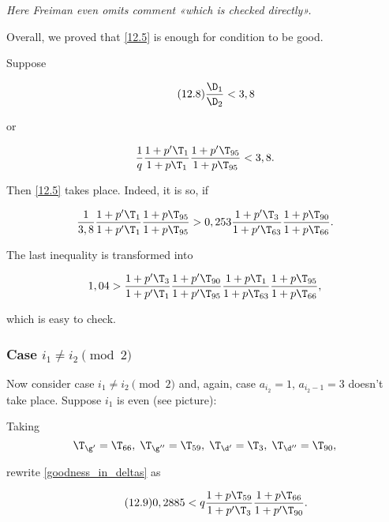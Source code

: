 {
	\itshape
	Here Freiman even omits comment «which is checked directly».
}

Overall, we proved that \ref{12.5} is enough for condition to be good.

Suppose

\begin{equation}\tag{12.8}\label{goodness_condition_3,8}
	\dfrac{\D_1}{\D_2} < 3,8
\end{equation}

or

\begin{equation*}
	\dfrac{1}{q}
	\dfrac{1 + p' \T_{1}}{1 + p \T_{1}}
	\dfrac{1 + p' \T_{95}}{1 + p \T_{95}}
	<
	3,8.
\end{equation*}

Then \ref{12.5} takes place. Indeed, it is so, if

\begin{equation*}
	\dfrac{1}{3,8}
	\dfrac{1 + p' \T_{1}}{1 + p' \T_{1}}
	\dfrac{1 + p \T_{95}}{1 + p \T_{95}}
	>
	0,253
	\dfrac{1 + p' \T_{3}}{1 + p' \T_{63}}
	\dfrac{1 + p \T_{90}}{1 + p \T_{66}}.
\end{equation*}

The last inequality is transformed into

\begin{equation*}
	1,04
	>
	\dfrac{1 + p' \T_{3}}{1 + p' \T_{1}}
	\dfrac{1 + p' \T_{90}}{1 + p' \T_{95}}
	\dfrac{1 + p \T_{1}}{1 + p \T_{63}}
	\dfrac{1 + p \T_{95}}{1 + p \T_{66}},
\end{equation*}

which is easy to check.

\subsubsection{Case $i_1 \ne i_2 \pmod 2$}

Now consider case $i_1 \ne i_2 \pmod 2$
and, again, case $a_{i_2} = 1$, $a_{i_2 - 1} = 3$
doesn't take place.
Suppose $i_1$ is even (see picture):


Taking
\begin{equation*}
	\T_{\g'} = \T_{66},\;
	\T_{\g''} = \T_{59},\;
	\T_{\d'} = \T_{3},\;
	\T_{\d''} = \T_{90},
\end{equation*}

rewrite \ref{goodness_in_deltas} as

\begin{equation}\tag{12.9}\label{12.9}
	0,2885
	<
	q
	\dfrac{1 + p \T_{59}}{1 + p' \T_{3}}
	\dfrac{1 + p \T_{66}}{1 + p' \T_{90}}.
\end{equation}


